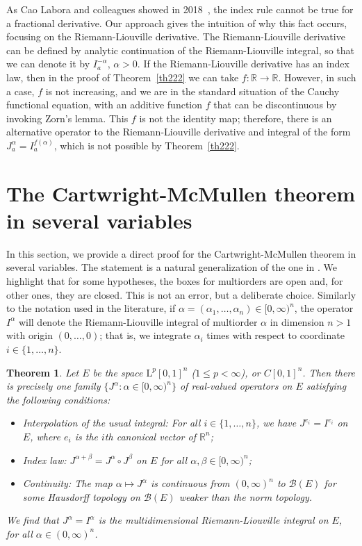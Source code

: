 \documentclass[12pt,reqno]{amsart}
\theoremstyle{plain}
\newtheorem{theorem}{Theorem}[section] %
\numberwithin{equation}{section} %
\begin{document}
As Cao Labora and colleagues showed in 2018~\cite{dif}, the index rule cannot be true for a fractional derivative. Our approach gives the intuition of why this fact occurs, focusing on the Riemann-Liouville derivative. The Riemann-Liouville derivative can be defined by analytic continuation of the Riemann-Liouville integral, so that we can denote it by $I_a^{-\alpha}$, $\alpha>0$. If the Riemann-Liouville derivative has an index law, then in the proof of Theorem~\ref{th222} we can take $f:\mathbb{R}\rightarrow\mathbb{R}$. However, in such a case, $f$ is not increasing, and we are in the standard situation of the Cauchy functional equation, with an additive function $f$ that can be discontinuous by invoking Zorn's lemma. This $f$ is not the identity map; therefore, there is an alternative operator to the Riemann-Liouville derivative and integral of the form $J_a^\alpha= I_a^{f(\alpha)}$, which is not possible by Theorem~\ref{th222}.

\section{The Cartwright-McMullen theorem in several variables} \label{sec3d}

In this section, we provide a direct proof for the Cartwright-McMullen theorem in several variables. The statement is a natural generalization of the one in \cite{cart}. We highlight that for some hypotheses, the boxes for multiorders are open and, for other ones, they are closed. This is not an error, but a deliberate choice. Similarly to the notation used in the literature, if $\alpha=(\alpha_1,\dots,\alpha_n) \in [0,\infty)^n$, the operator $I^\alpha$ will denote the Riemann-Liouville integral of multiorder $\alpha$ in dimension $n>1$ with origin $(0,\ldots,0)$; that is, we integrate $\alpha_i$ times with respect to coordinate $i \in \{1,\dots,n\}$.

\begin{theorem} \label{CartMc_several}
Let $E$ be the space $\mathrm{L}^p[0,1]^n$ ($1\leq p<\infty$), or $C[0,1]^n$. Then there is precisely one family $\{J^\alpha:\alpha \in [0,\infty)^n\}$ of real-valued operators on $E$ satisfying the following conditions:
\begin{itemize}
\item Interpolation of the usual integral: For all $i\in\{1,\ldots,n\}$, we have $J^{e_i}=I^{e_i}$ on $E$, where $e_i$ is the $i$th canonical vector of $\mathbb{R}^n$;
\item Index law: $J^{\alpha+\beta}=J^\alpha\circ J^\beta$ on $E$ for all $\alpha,\beta\in [0,\infty)^n$;
\item Continuity: The map $\alpha\mapsto J^{\alpha}$ is continuous from $(0,\infty)^n$ to $\mathcal{B}(E)$ for some Hausdorff topology on $\mathcal{B}(E)$ weaker than the norm topology.
\end{itemize}
We find that $J^\alpha=I^\alpha$ is the multidimensional Riemann-Liouville integral on $E$, for all $\alpha\in (0,\infty)^n$.
\end{theorem}
\end{document}
